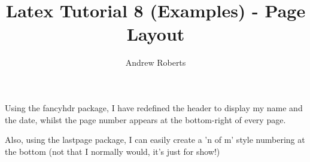 \documentclass[english,a4paper,twoside]{article}
\begin{document}
\title{Latex Tutorial 8 (Examples) - Page Layout}
\author{Andrew Roberts}
\maketitle

\thispagestyle{fancy}

Using the \textsf{fancyhdr} package, I have redefined the header to
display my name and the date, whilst the page number appears at the
bottom-right of every page.

Also, using the \textsf{lastpage} package, I can easily create a 'n of
m' style numbering at the bottom (not that I normally would, it's just
for show!)
\end{document}
